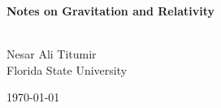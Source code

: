 \documentclass[12pt, oneside, a4paper]{book}
\theoremstyle{definition}
\begin{document}
\begin{titlepage}
    \centering
    \vspace*{5cm}
    
    {\huge \textbf{ Notes on Gravitation and Relativity}}\\
    \vspace{0.5cm}
    {\large \textit{}}\\
    
    \vspace{3cm}
    
    {\large Nesar Ali Titumir}\\
    \vspace{0.3cm}
    {\normalsize Florida State University}\\
    
    \vspace{3cm}
    
    {\normalsize \today}
    
    \vfill
    
    \small{}
    
\end{titlepage}

\frontmatter

\tableofcontents
\newpage



\mainmatter









% 

% 
% 
\end{document}
